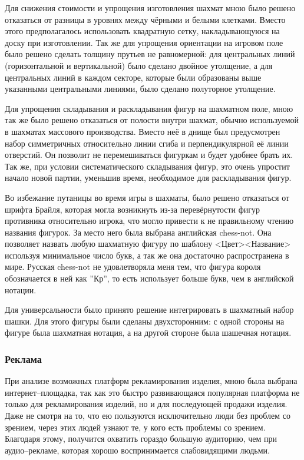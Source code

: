 Для снижения стоимости и упрощения изготовления шахмат мною было решено отказаться от
разницы в уровнях между чёрными и белыми клетками. Вместо этого предполагалось
использовать квадратную сетку, накладывающуюся на доску при изготовлении. Так
же для упрощения ориентации на игровом поле было решено сделать толщину прутьев
не равномерной: для центральных линий (горизонтальной и вертикальной) было
сделано двойное утолщение, а для центральных линий в каждом секторе, которые
были образованы выше указанными центральными линиями, было сделано полуторное
утолщение.

Для упрощения складывания и раскладывания фигур на шахматном поле, мною так же
было решено отказаться от полости внутри шахмат, обычно используемой в шахматах
массового производства. Вместо неё в днище был предусмотрен набор симметричных
относительно линии сгиба и перпендикулярной её линии отверстий. Он позволит не
перемешиваться фигуркам и будет удобнее брать их. Так же, при условии
систематического складывания фигур, это очень упростит начало новой партии,
уменьшив время, необходимое для раскладывания фигур.

Во избежание путаницы во время игры в шахматы, было решено отказаться от шрифта
Брайля, которая могла возникнуть из-за перевёрнутости фигур противника
относительно игрока, что могло привести к не правильному чтению названия
фигурок. За место него была выбрана английская \gls{chess-not}. Она позволяет
назвать любую шахматную фигуру по шаблону <Цвет><Название> используя
минимальное число букв, а так же она достаточно распространена в мире. Русская
\gls{chess-not} не удовлетворяла меня тем, что фигура короля обозначается в ней как
''Кр'', то есть использует больше букв, чем в английской нотации.

Для универсальности было принято решение интегрировать в шахматный набор шашки.
Для этого фигуры были сделаны двухсторонним: с одной стороны на фигуре была
шахматная нотация, а на другой стороне была шашечная нотация.

\subsubsection{Реклама}
При анализе возможных платформ рекламирования изделия, мною была выбрана
интернет--площадка, так как это быстро развивающаяся популярная платформа не
только для рекламирования изделий, но и для последующей продажи изделия. Даже
не смотря на то, что ею пользуются исключительно люди без проблем со зрением,
через этих людей узнают те, у кого есть проблемы со зрением. Благодаря этому,
получится охватить гораздо большую аудиторию, чем при аудио--рекламе, которая
хорошо воспринимается слабовидящими людьми.

